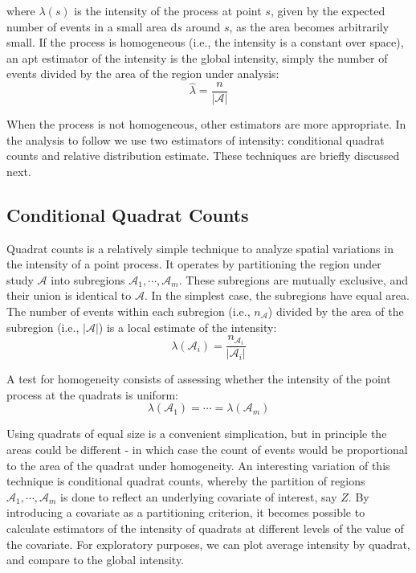 \documentclass[smallextended]{svjour3}       %
\begin{document}
where \(\lambda(s)\) is the intensity of the process at point \(s\),
given by the expected number of events in a small area \(\text{d}s\)
around \(s\), as the area becomes arbitrarily small. If the process is
homogeneous (i.e., the intensity is a constant over space), an apt
estimator of the intensity is the global intensity, simply the number of
events divided by the area of the region under analysis: \[
\hat{\lambda} = \frac{n}{|\mathcal{A}|}
\]

When the process is not homogeneous, other estimators are more
appropriate. In the analysis to follow we use two estimators of
intensity: conditional quadrat counts and relative distribution
estimate. These techniques are briefly discussed next.

\hypertarget{conditional-quadrat-counts}{%
\subsection{Conditional Quadrat
Counts}\label{conditional-quadrat-counts}}

Quadrat counts is a relatively simple technique to analyze spatial
variations in the intensity of a point process. It operates by
partitioning the region under study \(\mathcal{A}\) into subregions
\(\mathcal{A}_1,\cdots,\mathcal{A}_m\). These subregions are mutually
exclusive, and their union is identical to \(\mathcal{A}\). In the
simplest case, the subregions have equal area. The number of events
within each subregion (i.e., \(n_{\mathcal{A}}\)) divided by the area of
the subregion (i.e., \(|\mathcal{A}|\)) is a local estimate of the
intensity: \[
\lambda(\mathcal{A}_i)=\frac{n_{\mathcal{A}_i}}{|\mathcal{A}_i|}
\]

A test for homogeneity consists of assessing whether the intensity of
the point process at the quadrats is uniform: \[
\lambda(\mathcal{A}_1)=\cdots=\lambda(\mathcal{A}_m)
\]

Using quadrats of equal size is a convenient simplication, but in
principle the areas could be different - in which case the count of
events would be proportional to the area of the quadrat under
homogeneity. An interesting variation of this technique is conditional
quadrat counts, whereby the partition of regions
\(\mathcal{A}_1,\cdots,\mathcal{A}_m\) is done to reflect an underlying
covariate of interest, say \(Z\). By introducing a covariate as a
partitioning criterion, it becomes possible to calculate estimators of
the intensity of quadrats at different levels of the value of the
covariate. For exploratory purposes, we can plot average intensity by
quadrat, and compare to the global intensity.
\end{document}
